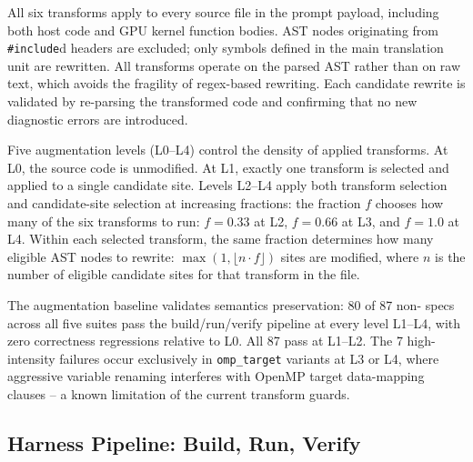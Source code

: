 All six transforms apply to every source file in the prompt payload, including both host code and GPU kernel function bodies. AST nodes originating from \texttt{\#include}d headers are excluded; only symbols defined in the main translation unit are rewritten. All transforms operate on the parsed AST rather than on raw text, which avoids the fragility of regex-based rewriting. Each candidate rewrite is validated by re-parsing the transformed code and confirming that no new diagnostic errors are introduced.


Five augmentation levels (L0--L4) control the density of applied transforms. At L0, the source code is unmodified. At L1, exactly one transform is selected and applied to a single candidate site. Levels L2--L4 apply both transform selection and candidate-site selection at increasing fractions: the fraction $f$ chooses how many of the six transforms to run: $f{=}0.33$ at L2, $f{=}0.66$ at L3, and $f{=}1.0$ at L4. Within each selected transform, the same fraction determines how many eligible AST nodes to rewrite: $\max(1, \lfloor n \cdot f \rfloor)$ sites are modified, where $n$ is the number of eligible candidate sites for that transform in the file.

The augmentation baseline validates semantics preservation: 80 of 87 non-\knownfail{} specs across all five suites pass the build/run/verify pipeline at every level L1--L4, with zero correctness regressions relative to L0. All 87 pass at L1--L2. The 7 high-intensity failures occur exclusively in \texttt{omp\_target} variants at L3 or L4, where aggressive variable renaming interferes with OpenMP target data-mapping clauses -- a known limitation of the current transform guards.

\subsection{Harness Pipeline: Build, Run, Verify}
\label{sec:harness}

